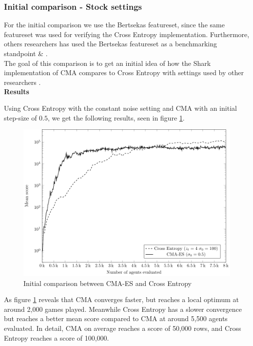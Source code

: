 \subsubsection{Initial comparison - Stock settings}
For the initial comparison we use the Bertsekas featureset, since the same featureset
was used for verifying the Cross Entropy implementation. Furthermore, others researchers
has used the Bertsekas featureset as a benchmarking standpoint \citep{thiery:09} \&
\citep{szita:06}.\\
The goal of this comparison is to get an initial idea of how the Shark implementation of
CMA compares to Cross Entropy with settings used by other researchers \citep{thiery:09}.\\

\textbf{Results}

Using Cross Entropy with the constant noise setting and CMA with an initial step-size
of $0.5$, we get the following results, seen in figure \ref{fig:CMA_VS_CE_00}.\\

\begin{figure}[H]
\begin{center}
\includegraphics[scale=0.8]{plots/cmaCePlot}
\end{center}
\caption{Initial comparison between CMA-ES and Cross Entropy \label{fig:CMA_VS_CE_00}}
\end{figure}

As figure \ref{fig:CMA_VS_CE_00} reveals that CMA converges faster,
but reaches a local optimum at around 2,000 games played. Meanwhile Cross Entropy has a 
slower convergence but reaches a better mean score compared to CMA at around 5,500
agents evaluated. In detail, CMA on average reaches a score of 50,000 rows, and
Cross Entropy reaches a score of 100,000.\\

